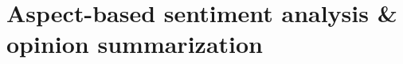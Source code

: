 \documentclass[t]{beamer}
\begin{document}

\section{Aspect-based sentiment analysis \& opinion summarization}
\end{document}
